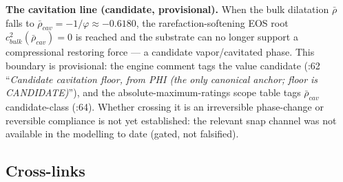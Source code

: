 \textbf{The cavitation line (candidate, provisional).} When the bulk dilatation $\bar\rho$ falls to $\bar\rho_{cav} = -1/\varphi \approx -0.6180$, the rarefaction-softening EOS root $c_{bulk}^2(\bar\rho_{cav}) = 0$ is reached and the substrate can no longer support a compressional restoring force --- a candidate vapor/cavitated phase. This boundary is provisional: the engine comment tags the value candidate (:62 ``\emph{Candidate cavitation floor, from PHI (the only canonical anchor; floor is CANDIDATE)}''), and the absolute-maximum-ratings scope table tags $\bar\rho_{cav}$ candidate-class (:64). Whether crossing it is an irreversible phase-change or reversible compliance is not yet established: the relevant snap channel was not available in the modelling to date (gated, not falsified).

\subsection{Cross-links}
\label{subsec:vol9_true_phase_crosslinks}

